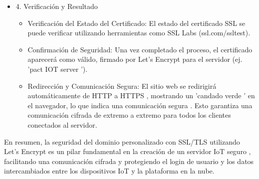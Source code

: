 \documentclass{report}
\begin{document}
\begin{itemize}
\begin{itemize}
    \end{itemize}
    \item 4. Verificación y Resultado
    \begin{itemize}
        \item Verificación del Estado del Certificado: El estado del certificado SSL se puede verificar utilizando herramientas como SSL Labs (ssl.com/ssltest).
        \item Confirmación de Seguridad: Una vez completado el proceso, el certificado aparecerá como válido, firmado por Let's Encrypt para el servidor (ej.  'pact IOT server ').
        \item Redirección y Comunicación Segura: El sitio web se  redirigirá automáticamente de HTTP a HTTPS , mostrando un  'candado verde ' en el navegador, lo que indica una  comunicación segura . Esto garantiza una  comunicación cifrada de extremo a extremo  para todos los clientes conectados al servidor.    
    \end{itemize}
\end{itemize}
En resumen, la seguridad del dominio personalizado con SSL/TLS utilizando Let's Encrypt es un pilar fundamental en la creación de un  servidor IoT seguro , 
facilitando una comunicación cifrada y protegiendo el login de usuario y los datos intercambiados entre los dispositivos IoT y la plataforma en la nube.
\end{document}
